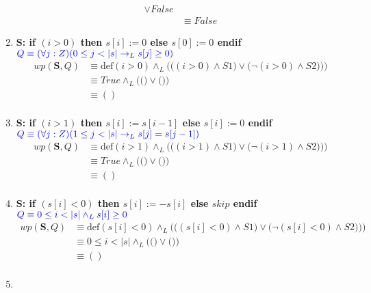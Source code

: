 \documentclass{article}
\begin{document}
\begin{enumerate}[label=\alph*)]
\begin{align*}
   								\vee False\\
   							&\equiv False
   		\end{align*}
	\item
		\textbf{S: if $(i>0)$ then $s[i] := 0$ else $s[0] := 0$ endif}\\
   		\hspace*{24mm}$\color{blue}Q \equiv (\forall j :Z)(0 \leq j < |s| 
   			\rightarrow_L s[j] \geq 0)$\\
   		\begin{align*}
   			wp(\textbf{S},Q)&\equiv \textrm{def}(i>0)\wedge_L 
   				\Bigg(\Big((i>0)\wedge S1\Big) \vee\Big(\neg (i>0)\wedge S2)\Big)\Bigg)\\
   							&\equiv True \wedge_L \Bigg(\Big(\Big) \vee \Big(\Big)\Bigg)\\
   							&\equiv () \\
   		\end{align*}
	\item
		\textbf{S: if $(i>1)$ then $s[i] := s[i-1]$ else $s[i] := 0$ endif}\\
   		\hspace*{24mm}$\color{blue}Q \equiv (\forall j :Z)(1 \leq j < |s| 
   			\rightarrow_L s[j] = s[j - 1])$\\
   		\begin{align*}
   			wp(\textbf{S},Q)&\equiv \textrm{def}(i>1)\wedge_L 
   				\Bigg(\Big((i>1)\wedge S1\Big) \vee\Big(\neg (i>1)\wedge S2)\Big)\Bigg)\\
   							&\equiv True \wedge_L\Bigg(\Big(\Big) \vee \Big(\Big)\Bigg)\\
   							&\equiv () \\
   		\end{align*}
	\item
		\textbf{S: if $(s[i]<0)$ then $s[i] := -s[i]$ else $skip$ endif}\\
   		\hspace*{24mm}$\color{blue}Q \equiv 0 \leq i < |s| \wedge_L s[i] \geq 0$\\
   		\begin{align*}
   			wp(\textbf{S},Q)&\equiv \textrm{def}(s[i]<0)\wedge_L 
   				\Bigg(\Big((s[i]<0)\wedge S1\Big) \vee\Big(\neg (s[i]<0)\wedge S2)\Big)\Bigg)\\
   							&\equiv 0\leq i<|s|\wedge_L\Bigg(\Big(\Big) \vee \Big(\Big)\Bigg)\\
   							&\equiv () \\
   		\end{align*}
   	\item

\end{enumerate}
\end{document}
